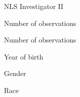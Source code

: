 \begin{frame}\begin{figure}[htp]\centering
\caption{NLS Investigator II}
\end{figure}\end{frame}
\begin{frame}\begin{figure}[htp]\centering
\caption{Number of observations}
\end{figure}\end{frame}
\begin{frame}\begin{figure}[htp]\centering
\caption{Number of observations}
\end{figure}\end{frame}
\begin{frame}\begin{figure}[htp]\centering
\caption{Year of birth}
\end{figure}\end{frame}
\begin{frame}\begin{figure}[htp]\centering
\caption{Gender}
\end{figure}\end{frame}
\begin{frame}\begin{figure}[htp]\centering
\caption{Race}
\end{figure}\end{frame}
